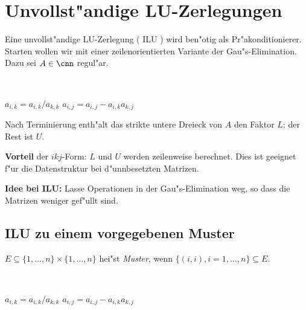 \section{Unvollst"andige LU-Zerlegungen}
Eine unvollst"andige LU-Zerlegung ( ILU ) wird ben"otig als Pr"akonditionierer.
Starten wollen wir mit einer zeilenorientierten Variante der Gau"s-Elimination.
Dazu sei $A\in \cnn$ regul"ar.

\begin{alg}
~               %
\vspace*{-2\baselineskip}       %
\begin{algorithm}
  \begin{algorithmic}
        \STATE $a_{i,k} = a_{i,k}/a_{k,k}$
          \STATE $a_{i,j} = a_{i,j} - a_{i,k} a_{k,j}$
        \ENDFOR
      \ENDFOR
    \ENDFOR
  \end{algorithmic}
\end{algorithm}
\end{alg}

Nach Terminierung enth"alt das strikte untere Dreieck von $A$ den Faktor $L$;
der Rest ist $U$.
\medskip

{\bf Vorteil} der $ikj$-Form: $L$ und $U$ werden zeilenweise berechnet. Dies ist geeignet f"ur die Datenstruktur bei d"unnbesetzten Matrizen.

\medskip

{\bf Idee bei ILU:} Lasse Operationen in der Gau"s-Elimination weg, so dass die Matrizen weniger gef"ullt sind.

\medskip

\subsection{ILU zu einem vorgegebenen Muster}

\begin{defn}
$E \subseteq \{1,\dots,n \} \times \{1,\dots,n\}$ hei"st {\em Muster}, wenn $\{(i,i) , i=1, \dots ,n\} \subseteq E.$
\end{defn}

\begin{alg}
~               %
\vspace*{-2\baselineskip}       %
\begin{algorithm}
  \begin{algorithmic}
          \STATE $a_{i,k} = a_{i,k}/a_{k,k}$
              \STATE $a_{i,j} = a_{i,j} - a_{i,k} a_{k,j}$
            \ENDIF
          \ENDFOR
        \ENDIF
      \ENDFOR
    \ENDFOR
  \end{algorithmic}
\end{algorithm}
\end{alg}


